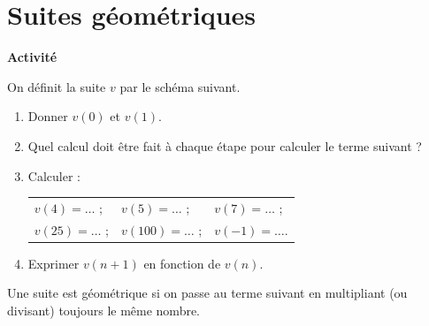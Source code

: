 %

\chapter{Suites géométriques}

\noindent\textbf{Activité}

On définit la suite $v$ par le schéma suivant.

%
\begin{minipage}[b]{.7\textwidth}
    \begin{enumerate}
        \item Donner $v(0)$ et $v(1)$.
        \item Quel calcul doit être fait à chaque étape pour calculer le terme suivant ?\\
        \item Calculer :

        \begin{tabularx}{\linewidth}{XXX}
            $v(4)=\ldots$ ;&
            $v(5)=\ldots$ ;&
            $v(7)=\ldots$ ;\\
            $v(25)=\ldots$ ;&
            $v(100)=\ldots$ ;&
            $v(-1)=\ldots$.\\
        \end{tabularx}
        \item Exprimer $v(n+1)$ en fonction de $v(n)$.
    \end{enumerate}
\end{minipage}

\bigskip

Une suite est géométrique si on passe au terme suivant en multipliant (ou divisant) toujours le même nombre.

